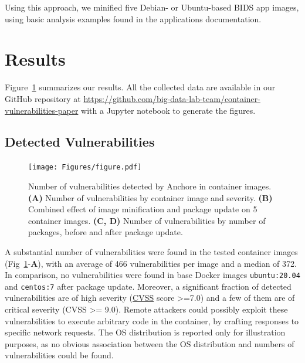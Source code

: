 \documentclass[a4paper,num-refs]{oup-contemporary}
\begin{document}
Using this approach, we minified five Debian- or Ubuntu-based BIDS app images,
using basic analysis examples found in the applications documentation.



\section{Results}

Figure~\ref{fig:vulnerabilities} summarizes our results. All the collected
data are available in our GitHub repository at
\url{https://github.com/big-data-lab-team/container-vulnerabilities-paper}
with a Jupyter notebook to generate the figures. 

\subsection{Detected Vulnerabilities}


\begin{figure}
\texttt{[image: Figures/figure.pdf]}
\caption{\label{fig:vulnerabilities} Number of vulnerabilities detected
by Anchore in container images. \textbf{(A)} Number of vulnerabilities
by container image and severity. \textbf{(B)} Combined
effect of image minification and package update on 5 container images. \textbf{(C, D)}
Number of vulnerabilities by number of packages, before and after
package update.}
\end{figure}

A substantial number of vulnerabilities were found in the tested container
 images (Fig~\ref{fig:vulnerabilities}-\textbf{A}), with an average of 466 vulnerabilities
  per image and a median of 372. In comparison, no vulnerabilities were found in base
 Docker images \texttt{ubuntu:20.04} and \texttt{centos:7} after package
 update. Moreover, a significant fraction of detected vulnerabilities are
 of high severity
 (\href{https://www.first.org/cvss/specification-document}{CVSS} score
 >=7.0) and a few of them are of critical severity (CVSS >= 9.0). Remote
 attackers could possibly exploit these vulnerabilities to execute
 arbitrary code in the container, by crafting responses to specific network
 requests. The OS distribution is reported only for illustration purposes,
 as no obvious association between the OS distribution and numbers of
 vulnerabilities could be found.
\end{document}
